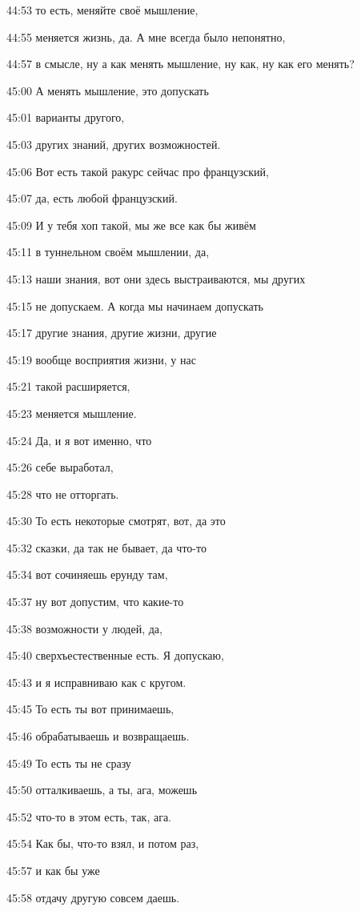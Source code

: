 44:53
то есть, меняйте своё мышление,

44:55
меняется жизнь, да. А мне всегда было непонятно,

44:57
в смысле, ну а как менять мышление, ну как, ну как его менять?

45:00
А менять мышление, это допускать

45:01
варианты другого,

45:03
других знаний, других возможностей.

45:06
Вот есть такой ракурс сейчас про французский,

45:07
да, есть любой французский.

45:09
И у тебя хоп такой, мы же все как бы живём

45:11
в туннельном своём мышлении, да,

45:13
наши знания, вот они здесь выстраиваются, мы других

45:15
не допускаем. А когда мы начинаем допускать

45:17
другие знания, другие жизни, другие

45:19
вообще восприятия жизни, у нас

45:21
такой расширяется,

45:23
меняется мышление.

45:24
Да, и я вот именно, что

45:26
себе выработал,

45:28
что не отторгать.

45:30
То есть некоторые смотрят, вот, да это

45:32
сказки, да так не бывает, да что-то

45:34
вот сочиняешь ерунду там,

45:37
ну вот допустим, что какие-то

45:38
возможности у людей, да,

45:40
сверхъестественные есть. Я допускаю,

45:43
и я исправниваю как с кругом.

45:45
То есть ты вот принимаешь,

45:46
обрабатываешь и возвращаешь.

45:49
То есть ты не сразу

45:50
отталкиваешь, а ты, ага, можешь

45:52
что-то в этом есть, так, ага.

45:54
Как бы, что-то взял, и потом раз,

45:57
и как бы уже

45:58
отдачу другую совсем даешь.

